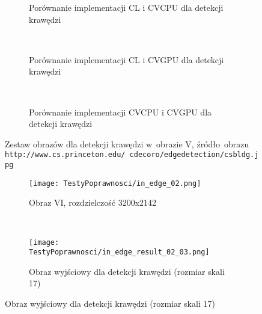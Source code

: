 \begin{itemize}
\begin{figure}[H]
\begin{subfigure}[t]{0.3\textwidth}
	\centering
	\setlength\fboxsep{0pt}
	\setlength\fboxrule{0.5pt}
	\caption{Porównanie implementacji CL i CVCPU dla detekcji krawędzi}
	\label{fig:valEdge0CLCVCPU}
\end{subfigure}
~
\begin{subfigure}[t]{0.3\textwidth}
	\centering
	\setlength\fboxsep{0pt}
	\setlength\fboxrule{0.5pt}
	\caption{Porównanie implementacji CL i CVGPU dla detekcji krawędzi}
	\label{fig:valEdge0CLCVGPU}
\end{subfigure}
~
\begin{subfigure}[t]{0.3\textwidth}
	\centering
	\setlength\fboxsep{0pt}
	\setlength\fboxrule{0.5pt}
	\caption{Porównanie implementacji CVCPU i CVGPU dla detekcji krawędzi}
	\label{fig:valEdge0CVCPUCVGPU}                 
\end{subfigure}
\caption{Zestaw obrazów dla detekcji krawędzi w~obrazie V, \tiny{źródło~obrazu \texttt{http://www.cs.princeton.edu/~cdecoro/edgedetection/csbldg.jpg}}}

\label{fig:valEdge0}
\end{figure}

\begin{figure}[H]

\begin{center}
\begin{subfigure}[t]{0.3\textwidth}
\texttt{[image: TestyPoprawnosci/in\_edge\_02.png]}
\caption{Obraz VI, rozdzielczość 3200x2142}
\label{fig:valEdge02}
\end{subfigure}
~
\begin{subfigure}[t]{0.3\textwidth}
\texttt{[image: TestyPoprawnosci/in\_edge\_result\_02\_03.png]}
\caption{Obraz wyjściowy dla detekcji krawędzi (rozmiar skali 17)}
\label{fig:valEdgeResult02}
\end{subfigure}
\end{center}


\end{figure}
\end{itemize}
